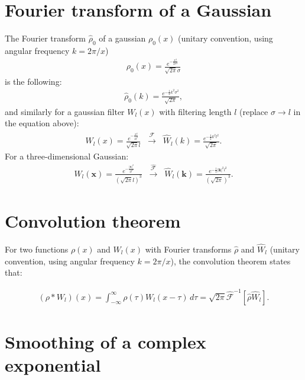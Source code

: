 \documentclass[]{article}
\begin{document}
\newpage

\appendix

\section{Fourier transform of a Gaussian}

The Fourier transform $\hat{\rho}_0$ of a gaussian $\rho_0 (x)$ (unitary convention, using angular frequency $k = 2 \pi / x$)
%
\begin{align}
\rho_0 (x) = \frac{e^{-\frac{x^2}{2 \sigma ^2}}}{\sqrt{2 \pi } \sigma }
\end{align}
%
is the following:
%
\begin{align}\label{eq:fourier_coeff_gaussian}
	\hat{\rho}_0 (k) = \frac{e^{-\frac{1}{2} k^2 \sigma ^2}}{\sqrt{2 \pi }},
\end{align}
%
and similarly for a gaussian filter $W_l (x)$ with filtering length $l$ (replace $\sigma \rightarrow l$ in the equation above):
%
\begin{align}
	W_l(x) = \frac{e^{-\frac{x^2}{2 l ^2}}}{\sqrt{2 \pi } l } \; \; \xrightarrow[]{\hat{\mathcal{F}}}  \; \; \hat{W}_l (k) = \frac{e^{-\frac{1}{2} k^2 l ^2}}{\sqrt{2 \pi }}.
\end{align}
%
For a three-dimensional Gaussian:
%
\begin{align}
	W_l(\bm x) = \frac{e^{-\frac{|\bm x|^2}{2 l ^2}}}{(\sqrt{2 \pi } l )^3} \; \; \xrightarrow[]{\hat{\mathcal{F}}}  \; \; \hat{W}_l (\bm k) = \frac{e^{-\frac{1}{2} |\bm k|^2 l ^2}}{(\sqrt{2 \pi })^3}.
\end{align}

\section{Convolution theorem}

For two functions $\rho (x)$ and $ W_l (x)$ with Fourier transforms $\hat{\rho}$ and $ \hat{W}_l$  (unitary convention, using angular frequency $k = 2 \pi / x$), the convolution theorem states that:

\begin{align}\label{app:convolution}
	( \rho * W_l) (x) =  \int_{-\infty}^{\infty} \rho(\tau) W_l(x-\tau)\, d\tau = \sqrt{2 \pi} \hat{\mathcal{F}}^{-1} \left[ \hat{\rho} \hat{W}_l \right].
\end{align}

\section{Smoothing of a complex exponential}\label{app:smoothing_exp}
\end{document}
